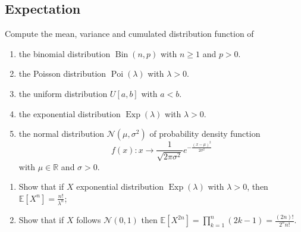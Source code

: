 \begin{center}
  \section*{Expectation}
\end{center}

\begin{Exercise}
  Compute the mean, variance and cumulated distribution function of
  \vspace*{0.2cm}

  \begin{enumerate}
    \item the binomial distribution $\operatorname{Bin}(n, p)$ with $n \geq 1$ and $p>0$.

    \item the Poisson distribution $\operatorname{Poi}(\lambda)$ with $\lambda>0$.

    \item the uniform distribution $U[a, b]$ with $a<b$.

    \item the exponential distribution $\operatorname{Exp}(\lambda)$ with $\lambda>0$.

    \item the normal distribution $\mathcal{N}\left(\mu, \sigma^{2}\right)$ of probability density function
          $$ f(x) : x \to \frac{1}{\sqrt{2\pi \sigma^2}} e^{- \frac{(x-\mu)^2}{2 \sigma^2}}$$
          with $\mu \in \mathbb{R}$ and $\sigma>0$.

  \end{enumerate}
\end{Exercise}

\begin{Exercise}
  \begin{enumerate}
    \item Show that if $X$ exponential distribution $\operatorname{Exp}(\lambda)$ with $\lambda>0$, then $\mathbb{E}\left[X^{n}\right]=\frac{n !}{\lambda^{n}}$;

    \item Show that if $X$ follows $\mathcal{N}(0,1)$ then $\mathbb{E}\left[X^{2 n}\right]=\prod_{k=1}^{n}(2 k-1)=\frac{(2 n) !}{2^{n} n !}$.

  \end{enumerate}
\end{Exercise}

